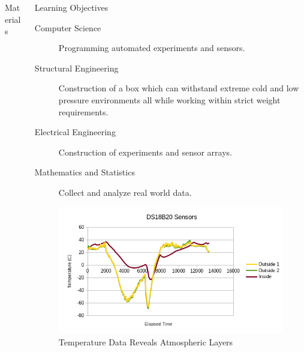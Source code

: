 \documentclass[final]{beamer}
\newlength{\onecolwid}
\newlength{\twocolwid}
\begin{document}
\begin{frame}[t]
\begin{columns}[t]
\begin{column}{\twocolwid}
\begin{columns}[t,totalwidth=\twocolwid]
\begin{column}{\onecolwid}
\begin{block}{Materials}
\end{block}



\end{column} %

\begin{column}{\onecolwid} %




\begin{block}{Learning Objectives}
\begin{description}
\item[Computer Science] Programming automated experiments and sensors.
\item[Structural Engineering] Construction of a box which can withstand extreme cold and low pressure environments all while working within strict weight requirements.
\item[Electrical Engineering] Construction of experiments and sensor arrays.
\item[Mathematics and Statistics] Collect and analyze real world data.
\end{description}
\end{block}


\begin{figure}
    \includegraphics[width=0.8\linewidth]{ds18b20-data}
    \caption{Temperature Data Reveals Atmospheric Layers}
\end{figure}




\end{column}
\end{columns}
\end{column}
\end{columns}
\end{frame}
\end{document}
